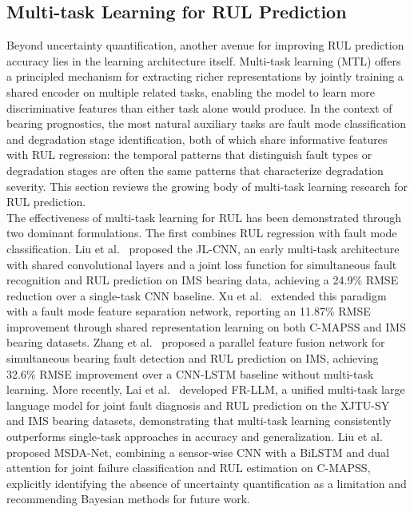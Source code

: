 \subsection{Multi-task Learning for RUL Prediction}
\label{sec:multitask_rul}

Beyond uncertainty quantification, another avenue for improving
RUL prediction accuracy lies in the learning architecture itself.
Multi-task learning (MTL) offers a principled mechanism for
extracting richer representations by jointly training a shared
encoder on multiple related tasks, enabling the model to learn
more discriminative features than either task alone would produce.
In the context of bearing prognostics, the most natural auxiliary
tasks are fault mode classification and degradation stage
identification, both of which share informative features with RUL
regression: the temporal patterns that distinguish fault types or
degradation stages are often the same patterns that characterize
degradation severity. This section reviews the growing body of
multi-task learning research for RUL prediction.\\

The effectiveness of multi-task learning for RUL has been
demonstrated through two dominant formulations. The first combines
RUL regression with fault mode classification.
Liu et al.~\cite{8709822} proposed the JL-CNN, an early
multi-task architecture with shared convolutional layers and a joint
loss function for simultaneous fault recognition and RUL prediction
on IMS bearing data, achieving a 24.9\% RMSE reduction over a
single-task CNN baseline.
Xu et al.~\cite{xu_novel_2025} extended this paradigm with a fault
mode feature separation network, reporting an 11.87\% RMSE
improvement through shared representation learning on both C-MAPSS
and IMS bearing datasets.
Zhang et al.~\cite{10216122} proposed a parallel feature fusion
network for simultaneous bearing fault detection and RUL prediction
on IMS, achieving 32.6\% RMSE improvement over a CNN-LSTM baseline
without multi-task learning.
More recently, Lai et al.~\cite{LAI2026112091} developed FR-LLM, a
unified multi-task large language model for joint fault diagnosis
and RUL prediction on the XJTU-SY and IMS bearing datasets,
demonstrating that multi-task learning consistently outperforms
single-task approaches in accuracy and generalization.
Liu et al.~\cite{11434241} proposed MSDA-Net, combining a
sensor-wise CNN with a BiLSTM and dual attention for joint failure
classification and RUL estimation on C-MAPSS, explicitly
identifying the absence of uncertainty quantification as a
limitation and recommending Bayesian methods for future work.\\

